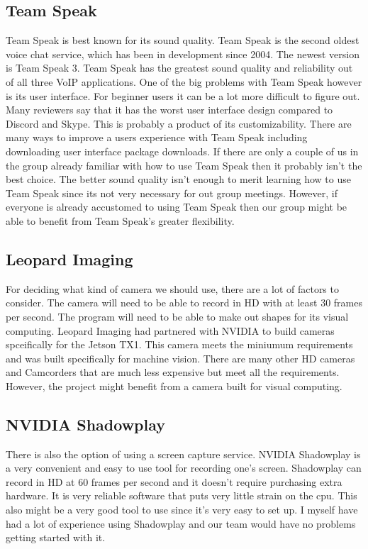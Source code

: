 \documentclass{scrreprt}
\begin{document}
\subsection{Team Speak}
Team Speak is best known for its sound quality.
Team Speak is the second oldest voice chat service, which has been in development since 2004.
The newest version is Team Speak 3.
Team Speak has the greatest sound quality and reliability out of all three VoIP applications.
One of the big problems with Team Speak however is its user interface.
For beginner users it can be a lot more difficult to figure out.
Many reviewers say that it has the worst user interface design compared to Discord and Skype.
This is probably a product of its customizability.
There are many ways to improve a users experience with Team Speak including downloading user interface package downloads.
If there are only a couple of us in the group already familiar with how to use Team Speak then it probably isn't the best choice.
The better sound quality isn't enough to merit learning how to use Team Speak since its not very necessary for out group meetings.
However, if everyone is already accustomed to using Team Speak then our group might be able to benefit from Team Speak's greater flexibility.

\subsection{Leopard Imaging}
For deciding what kind of camera we should use, there are a lot of factors to consider.
The camera will need to be able to record in HD with at least 30 frames per second.
The program will need to be able to make out shapes for its visual computing.
Leopard Imaging had partnered with NVIDIA to build cameras spceifically for the Jetson TX1.
This camera meets the miniumum requirements and was built specifically for machine vision.
There are many other HD cameras and Camcorders that are much less expensive but meet all the requirements.
However, the project might benefit from a camera built for visual computing.

\subsection{NVIDIA Shadowplay}
There is also the option of using a screen capture service.
NVIDIA Shadowplay is a very convenient and easy to use tool for recording one's screen.
Shadowplay can record in HD at 60 frames per second and it doesn't require purchasing extra hardware.
It is very reliable software that puts very little strain on the cpu.
This also might be a very good tool to use since it's very easy to set up.
I myself have had a lot of experience using Shadowplay and our team would have no problems getting started with it.
\end{document}
